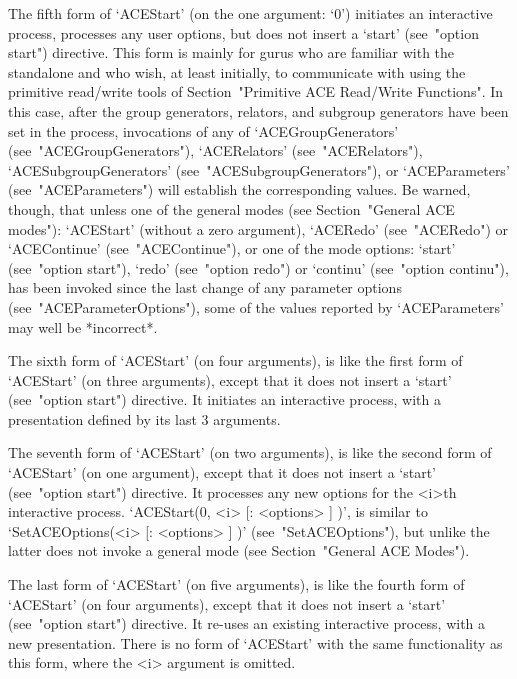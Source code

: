 The fifth form of `ACEStart' (on the one argument: `0')  initiates  an
interactive {\ACE} process, processes any user options, but  does  not
insert a `start' (see~"option start") directive. This form  is  mainly
for gurus who are familiar with the {\ACE} standalone and who wish, at
least initially,  to  communicate  with  {\ACE}  using  the  primitive
read/write tools of  Section~"Primitive ACE Read/Write Functions".  In
this  case,  after  the  group  generators,  relators,  and   subgroup
generators have been set in the {\ACE} process, invocations of any  of
`ACEGroupGenerators'     (see~"ACEGroupGenerators"),     `ACERelators'
(see~"ACERelators"),                           `ACESubgroupGenerators'
(see~"ACESubgroupGenerators"),           or            `ACEParameters'
(see~"ACEParameters") will establish the corresponding {\GAP}  values.
Be warned, though, that unless one of the general  {\ACE}  modes  (see
Section~"General ACE modes"): `ACEStart' (without  a  zero  argument),
`ACERedo' (see~"ACERedo") or `ACEContinue' (see~"ACEContinue"), or one
of the mode options: `start' (see~"option start"), `redo' (see~"option
redo") or `continu' (see~"option continu"), has been invoked since the
last change of any parameter options (see~"ACEParameterOptions"), some
of the values reported by `ACEParameters' may well be *incorrect*.

The sixth form of `ACEStart' (on four arguments), is  like  the  first
form of `ACEStart' (on three  arguments),  except  that  it  does  not
insert a `start'  (see~"option  start")  directive.  It  initiates  an
interactive {\ACE} process, with a presentation defined by its last  3
arguments.

The seventh form of `ACEStart' (on two arguments), is like the  second
form of `ACEStart' (on one argument), except that it does not insert a
`start' (see~"option start") directive. It processes any  new  options
for  the  <i>th  interactive  {\ACE}  process.  `ACEStart(0,  <i>   [:
<options> ] )', is similar to `SetACEOptions(<i>  [:  <options>  ]  )'
(see~"SetACEOptions"), but unlike the latter does not invoke a general
mode (see Section~"General ACE Modes").

The last form of `ACEStart' (on five arguments), is  like  the  fourth
form of `ACEStart' (on four arguments), except that it does not insert
a `start' (see~"option  start")  directive.  It  re-uses  an  existing
interactive {\ACE} process, with a new presentation. There is no  form
of `ACEStart' with the same functionality as this form, where the  <i>
argument is omitted.

